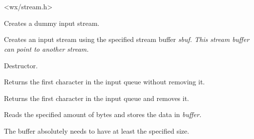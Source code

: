 \section{}\label{wxinputstream}




<wx/stream.h>





Creates a dummy input stream.


Creates an input stream using the specified stream buffer \it{sbuf}. This
stream buffer can point to another stream.



Destructor.



Returns the first character in the input queue without removing it.



Returns the first character in the input queue and removes it.



Reads the specified amount of bytes and stores the data in \it{buffer}.


The buffer absolutely needs to have at least the specified size.

